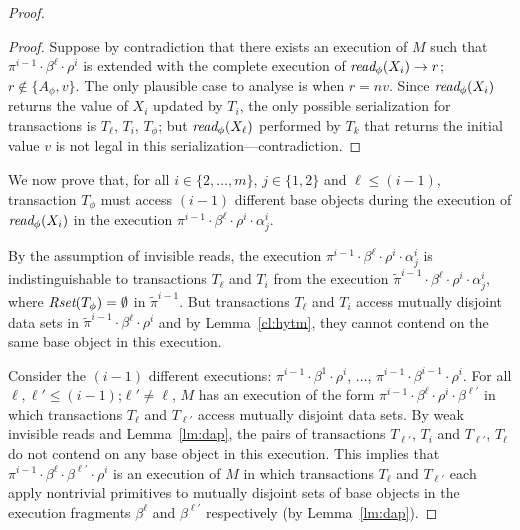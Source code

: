 \begin{proof}
\begin{proof}
Suppose by contradiction that there exists an execution of $M$ such that
$\pi^{i-1}\cdot\beta^{\ell}\cdot \rho^i$ is extended with the complete execution
of $\textit{read}_{\phi}(X_i) \rightarrow r$; $r \not\in \{A_{\phi},v\}$. 
The only plausible case to analyse is when $r=nv$.
Since $\textit{read}_{\phi}(X_i)$ returns the value of $X_i$ updated by $T_i$, 
the only possible serialization for transactions is $T_{\ell}$, $T_i$, $T_{\phi}$; but $\textit{read}_{\phi}(X_{\ell})$
performed by $T_k$ that returns the initial value $v$
is not legal in this serialization---contradiction.
\end{proof}
%
We now prove that, for all $i\in \{2,\ldots, m\}$, $j\in \{1,2\}$ and $\ell \leq (i-1)$, transaction $T_{\phi}$ must access
$(i-1)$ different base objects during the execution of $\textit{read}_{\phi}(X_i)$ in the execution
$\pi^{i-1}\cdot \beta^{\ell}\cdot \rho^i \cdot \alpha_j^i$.

By the assumption of invisible reads,
the execution $\pi^{i-1}\cdot \beta^{\ell}\cdot \rho^i \cdot \alpha_j^i$
is indistinguishable to
transactions $T_{\ell}$ and $T_{i}$
from the execution ${\tilde \pi}^{i-1}\cdot \beta^{\ell}\cdot \rho^i \cdot \alpha_j^i$, where $\textit{Rset}(T_{\phi})=\emptyset$
in ${\tilde \pi}^{i-1}$.
But transactions $T_{\ell}$ and $T_{i}$ access mutually disjoint data sets in ${\tilde \pi}^{i-1}\cdot \beta^{\ell}\cdot \rho^i$ and by Lemma~\ref{cl:hytm},
they cannot contend on the same base object in this execution.

Consider the $(i-1)$ different executions: 
$\pi^{i-1}\cdot\beta^{1}\cdot \rho^i$, $\ldots$, $\pi^{i-1}\cdot\beta^{i-1}\cdot \rho^i$.
For all $\ell, \ell' \leq (i-1)$;$\ell' \neq \ell$, 
$M$ has an execution of the form $\pi^{i-1}\cdot \beta^{\ell}\cdot \rho^i \cdot \beta^{\ell'}$
in which transactions $T_{\ell}$ and $T_{\ell'}$ access mutually disjoint data sets.
By weak invisible reads and Lemma~\ref{lm:dap}, the pairs of transactions $T_{\ell'}$, $T_{i}$ and $T_{\ell'}$, $T_{\ell}$
do not contend on any base object in this execution.
This implies that $\pi^{i-1}\cdot \beta^{\ell} \cdot \beta^{\ell'} \cdot \rho^i$ is an execution of $M$ in which
transactions $T_{\ell}$ and $T_{\ell'}$ each apply nontrivial primitives
to mutually disjoint sets of base objects in the execution fragments $\beta^{\ell}$ and $\beta^{\ell'}$ respectively 
(by Lemma~\ref{lm:dap}).


\end{proof}
